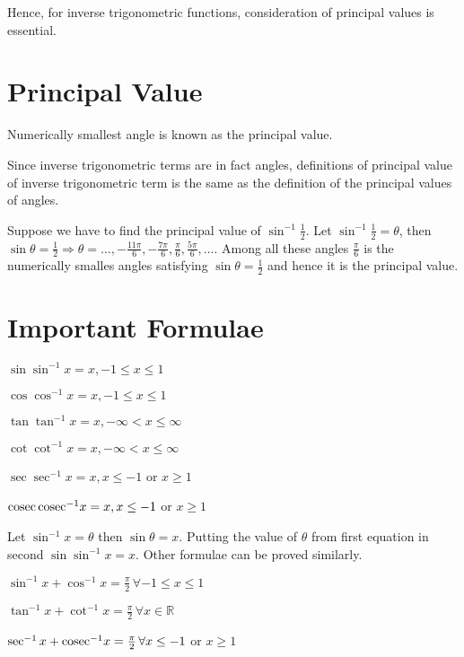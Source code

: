 Hence, for inverse trigonometric functions, consideration of principal values is essential.

\section{Principal Value}
Numerically smallest angle is known as the principal value.

Since inverse trigonometric terms are in fact angles, definitions of principal value of inverse trigonometric term is the same as
the definition of the principal values of angles.

Suppose we have to find the principal value of $\sin^{-1}\frac{1}{2}$. Let $\sin^{-1}\frac{1}{2} = \theta$, then $\sin\theta =
\frac{1}{2} \Rightarrow \theta = \ldots, -\frac{11\pi}{6}, -\frac{7\pi}{6}, \frac{\pi}{6}, \frac{5\pi}{6}, \ldots$. Among all these
angles $\frac{\pi}{6}$ is the numerically smalles angles satisfying $\sin\theta = \frac{1}{2}$ and hence it is the principal value.

\section{Important Formulae}
\starttheorem
  \startitemize[n]
  \item $\sin\sin^{-1}x = x, -1\leq x\leq 1$
  \item $\cos\cos^{-1}x = x, -1\leq x\leq 1$
  \item $\tan\tan^{-1}x = x, -\infty < x\leq\infty$
  \item $\cot\cot^{-1}x = x, -\infty < x\leq\infty$
  \item $\sec\sec^{-1}x = x, x\leq -1$ or $x\geq 1$
  \item ${\rm cosec\,cosec}^{-1}x = x, x\leq -1$ or $x\geq 1$
  \stopitemize
\stoptheorem

\startproof
Let $\sin^{-1}x = \theta$ then $\sin\theta = x$. Putting the value of $\theta$ from first equation in second
$\sin\sin^{-1}x = x$. Other formulae can be proved similarly.
\stopproof

\starttheorem
  \startitemize[n]
  \item $\sin^{-1}x + \cos^{-1}x = \frac{\pi}{2}\,\forall -1\leq x\leq 1$
  \item $\tan^{-1}x + \cot^{-1}x = \frac{\pi}{2}\,\forall x\in\mathbb{R}$
  \item $\sec^{-1}x + {\rm cosec}^{-1}x = \frac{\pi}{2}\,\forall x\leq -1$ or $x\geq 1$
  \stopitemize
\stoptheorem

